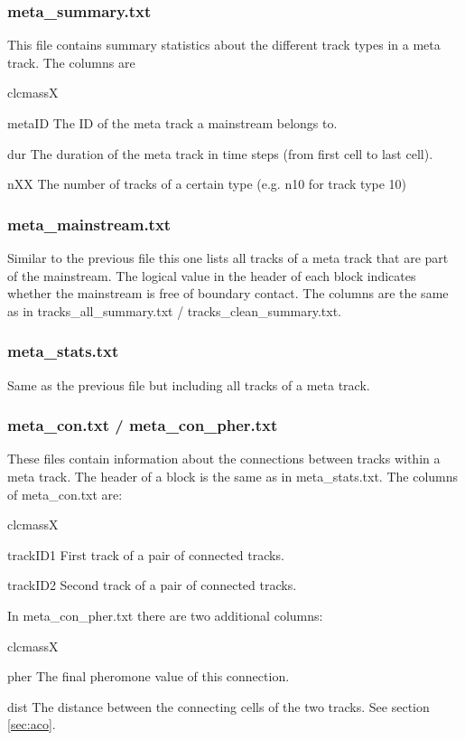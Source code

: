 \documentclass{scrartcl}
\begin{document}
\subsubsection{meta\_summary.txt}
This file contains summary statistics about the different track types in a meta track. The columns are
\begin{labeling}{clcmassX}
	\item[metaID] The ID of the meta track a mainstream belongs to.
	\item[dur] The duration of the meta track in time steps (from first cell to last cell). 
	\item[nXX] The number of tracks of a certain type (e.g. n10 for track type 10)
\end{labeling}


\subsubsection{meta\_mainstream.txt}
Similar to the previous file this one lists all tracks of a meta track that are part of the mainstream. The logical value in the header of each block indicates whether the mainstream is free of boundary contact. The columns are the same as in tracks\_all\_summary.txt / tracks\_clean\_summary.txt.

\subsubsection{meta\_stats.txt}
Same as the previous file but including all tracks of a meta track.

\subsubsection{meta\_con.txt / meta\_con\_pher.txt}
These files contain information about the connections between tracks within a meta track. The header of a block is the same as in meta\_stats.txt. The columns of meta\_con.txt are:
\begin{labeling}{clcmassX}
	\item[trackID1] First track of a pair of connected tracks.
	\item[trackID2] Second track of a pair of connected tracks.
\end{labeling}
In meta\_con\_pher.txt there are two additional columns:
\begin{labeling}{clcmassX}
	\item[pher] The final pheromone value of this connection.
	\item[dist] The distance between the connecting cells of the two tracks. See section \ref{sec:aco}.
\end{labeling}
\end{document}
